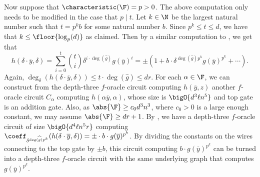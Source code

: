 \documentclass[letterpaper, 11pt]{amsart}
\begin{document}
\begin{pf}
    Now suppose that $\characteristic(\F) = p > 0$.
    The above computation only needs to be modified in the case that $p \mid t$.
    Let $k \in \N$ be the largest natural number such that $t = p^k b$ for some natural number $b$.
    Since $p^k \leq t \leq d$, we have that $k \leq \floor{\log_p(d)}$ as claimed.
    Then by a similar computation to , we get that
    \begin{equation}\label{eq:pfaff_computation_char_p}
        h(\delta \cdot \overline{y}, \delta) = \sum_{i = 0}^t \binom{t}{i} \delta^{i \cdot \deg(\widehat{g})} g(\overline{y})^i = \pm(1 + b \cdot \delta^{\deg(\widehat{g}) p^k} g(\overline{y})^{p^k} + \cdots).
    \end{equation}
    Again, $\deg_\delta(h(\delta \cdot \overline{y}, \delta)) \leq t \cdot \deg(\widehat{g}) \leq dr$.
    For each $\alpha\in\F$, we can construct from the depth-three $f$-oracle circuit computing $h(\overline{y},z)$ another $f$-oracle circuit $C_\alpha$ computing $h(\alpha \overline{y}, \alpha)$, whose size is $\bigO{d^3 \ell n^5}$ and top gate is an addition gate.
    Also, as $\abs{\F} \geq c_0 d^3 n^3$, where $c_0>0$ is a large enough constant, we may assume $\abs{\F} \geq dr+1$.
    By , we have a depth-three $f$-oracle circuit of size $\bigO{d^4 \ell n^5 r}$ computing $\coeff_{\delta^{\deg(\widehat{g})p^k}}(h(\delta\cdot \overline{y},\delta))= \pm \cdot b \cdot g(\overline{y})^{p^k}$.
    By dividing the constants on the wires connecting to the top gate by $\pm b$, this circuit computing $b\cdot g(\overline{y})^{p^k}$ can be turned into a depth-three $f$-oracle circuit with the same underlying graph that computes $g(\overline{y})^{p^k}$.
\end{pf}
\end{document}
